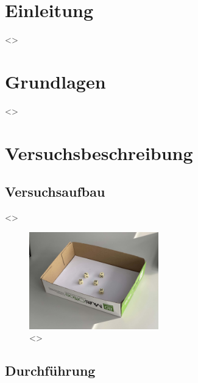 \documentclass[a4paper,12pt]{article}
\begin{document}
\tableofcontents
\newpage


\section{Einleitung}

<>

\section{Grundlagen}

<>


\section{Versuchsbeschreibung}
\subsection{Versuchsaufbau}

<>

\begin{figure}[H]
    \centering
    \includegraphics[width=0.5\textwidth]{bilder/Versuchsaufbau1.jpg}           %
    \caption{<>}                                                                %
    \label{AbbVersuchsaufbau1}
\end{figure}

\subsection{Durchführung}
\end{document}
